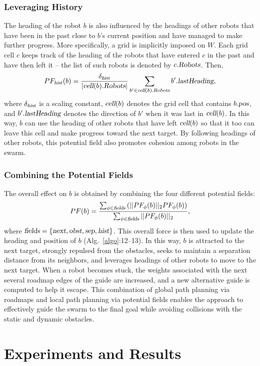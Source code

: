 \documentclass[letterpaper, 10pt, conference]{ieeeconf}
\newcommand{\Var}[1]{\ensuremath{{{\textsl{#1}}}}}
\begin{document}
\subsubsection{Leveraging History}
\label{sec:PFhist}
The heading of the robot $b$ is also influenced by the headings of
other robots that have been in the past close to $b$'s current position and have
managed to make further progress. More specifically, a grid is
implicitly imposed on $W$. Each grid cell $c$ keeps track of the
heading of the robots that have entered $c$ in the past and have then
left it -- the list of such robots is denoted by $c.\Var{Robots}$.
Then,
$$
PF_\Var{hist}(b) = \frac{\delta_\Var{hist}}{|\Var{cell}(b).\Var{Robots}|}\sum_{b' \in \Var{cell}(b).\Var{Robots}} b'.\Var{lastHeading},
$$ where $\delta_\Var{hist}$ is a scaling constant, $\Var{cell}(b)$
denotes the grid cell that contains $b.\Var{pos}$, and
$b'.\Var{lastHeading}$ denotes the direction of $b'$ when it was last
in $\Var{cell}(b)$. In this way, $b$ can use the heading of other
robots that have left $\Var{cell}(b)$ so that it too can leave this
cell and make progress toward the next target. By following headings
of other robots, this potential field also promotes cohesion among
robots in the swarm.


\subsubsection{Combining the Potential Fields}
\label{sec:PFcombine}
The overall effect on $b$ is obtained by combining the four different
potential fields:
$$
PF(b) = \frac{\sum_{\phi \in \Var{fields}} \left(|| PF_\phi(b)||_2
  PF_\phi(b)\right)}{\sum_{\phi \in \Var{fields}} || PF_\phi(b)||_2},
$$ where $\Var{fields} = \{\Var{next}, \Var{obst}, \Var{sep},
\Var{hist}\}$. This overall force is then used to update the heading
and position of $b$ (Alg.~\ref{algo}:12--13).  In this way, $b$ is
attracted to the next target, strongly repulsed from the obstacles,
seeks to maintain a separation distance from its neighbors, and
leverages headings of other robots to move to the next target. When a
robot becomes stuck, the weights associated with the next several
roadmap edges of the guide are increased, and a new alternative guide
is computed to help it escape.  This combination of global path
planning via roadmaps and local path planning via potential fields
enables the approach to effectively guide the swarm to the final goal
while avoiding collisions with the static and dynamic obstacles.


\section{Experiments and Results}
\label{sec:ExpResults}
\end{document}
